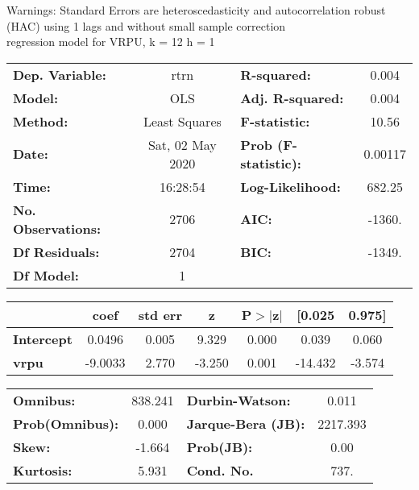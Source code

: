 Warnings: \newline
 [1] Standard Errors are heteroscedasticity and autocorrelation robust (HAC) using 1 lags and without small sample correction\\ 

regression model for VRPU, k = 12 h = 1\begin{center}
\begin{tabular}{lclc}
\toprule
\textbf{Dep. Variable:}    &       rtrn       & \textbf{  R-squared:         } &     0.004   \\
\textbf{Model:}            &       OLS        & \textbf{  Adj. R-squared:    } &     0.004   \\
\textbf{Method:}           &  Least Squares   & \textbf{  F-statistic:       } &     10.56   \\
\textbf{Date:}             & Sat, 02 May 2020 & \textbf{  Prob (F-statistic):} &  0.00117    \\
\textbf{Time:}             &     16:28:54     & \textbf{  Log-Likelihood:    } &    682.25   \\
\textbf{No. Observations:} &        2706      & \textbf{  AIC:               } &    -1360.   \\
\textbf{Df Residuals:}     &        2704      & \textbf{  BIC:               } &    -1349.   \\
\textbf{Df Model:}         &           1      & \textbf{                     } &             \\
\bottomrule
\end{tabular}
\begin{tabular}{lcccccc}
                   & \textbf{coef} & \textbf{std err} & \textbf{z} & \textbf{P$> |$z$|$} & \textbf{[0.025} & \textbf{0.975]}  \\
\midrule
\textbf{Intercept} &       0.0496  &        0.005     &     9.329  &         0.000        &        0.039    &        0.060     \\
\textbf{vrpu}      &      -9.0033  &        2.770     &    -3.250  &         0.001        &      -14.432    &       -3.574     \\
\bottomrule
\end{tabular}
\begin{tabular}{lclc}
\textbf{Omnibus:}       & 838.241 & \textbf{  Durbin-Watson:     } &    0.011  \\
\textbf{Prob(Omnibus):} &   0.000 & \textbf{  Jarque-Bera (JB):  } & 2217.393  \\
\textbf{Skew:}          &  -1.664 & \textbf{  Prob(JB):          } &     0.00  \\
\textbf{Kurtosis:}      &   5.931 & \textbf{  Cond. No.          } &     737.  \\
\bottomrule
\end{tabular}
\end{center}

